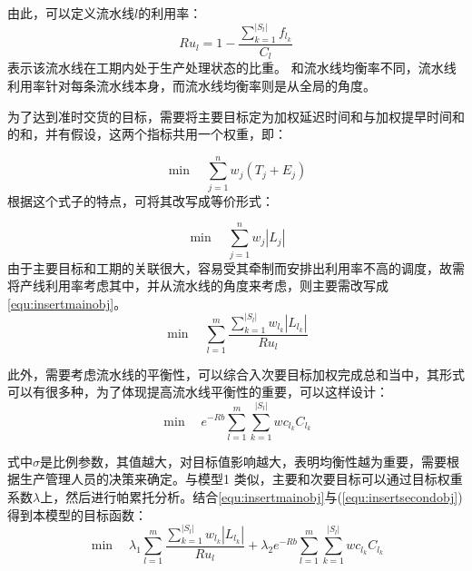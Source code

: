 由此，可以定义流水线$l$的利用率：
\[
Ru_l = 1 - \frac{\sum_{k=1}^{|S_l|}f_{l_k}}{C_l}
\]
表示该流水线在工期内处于生产处理状态的比重。
和流水线均衡率不同，流水线利用率针对每条流水线本身，而流水线均衡率则是从全局的角度。

为了达到准时交货的目标，需要将主要目标定为加权延迟时间和与加权提早时间和的和，并有假设，这两个指标共用一个权重，即：

\[
\min \quad \sum_{j = 1}^n w_j(T_j + E_j)
\]
根据这个式子的特点，可将其改写成等价形式：

\[
\min \quad \sum_{j = 1}^n w_j|L_j|
\]
由于主要目标和工期的关联很大，容易受其牵制而安排出利用率不高的调度，故需将产线利用率考虑其中，并从流水线的角度来考虑，则主要需改写成\eqref{equ:insertmainobj}。
\begin{equation}
\min \quad \sum_{l = 1}^m\frac{\sum_{k=1}^{|S_l|} w_{l_k}|L_{l_k}|}{Ru_l}\label{equ:insertmainobj}
\end{equation}

此外，需要考虑流水线的平衡性，可以综合入次要目标加权完成总和当中，其形式可以有很多种，为了体现提高流水线平衡性的重要，可以这样设计：
\begin{equation}
\min \quad e^{-Rb}\sum_{l=1}^m\sum_{k=1}^{|S_l|}wc_{l_k}C_{l_k}
\label{equ:insertsecondobj}
\end{equation}

式中$\sigma$是比例参数，其值越大，对目标值影响越大，表明均衡性越为重要，需要根据生产管理人员的决策来确定。与模型1 类似，主要和次要目标可以通过目标权重系数$\lambda$上，然后进行帕累托分析。结合\eqref{equ:insertmainobj}与(\ref{equ:insertsecondobj})得到本模型的目标函数：
\begin{equation}
\min \quad \lambda_1\sum_{l = 1}^m\frac{\sum_{k=1}^{|S_l|}w_{l_k}|L_{l_k}|}{Ru_l} + \lambda_2 e^{- Rb}\sum_{l=1}^m\sum_{k=1}^{|S_l|}wc_{l_k}C_{l_k}
\label{equ:insertobj}
\end{equation}

